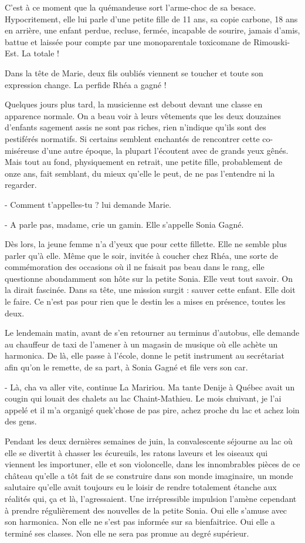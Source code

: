 C’est à ce moment que la quémandeuse sort l’arme-choc de sa besace. Hypocritement, elle lui parle d’une petite fille de 11 ans, sa copie carbone, 18 ans en arrière, une enfant perdue, recluse, fermée, incapable de sourire, jamais d’amis, battue et laissée pour compte par une monoparentale toxicomane de Rimouski-Est. La totale !

Dans la tête de Marie, deux fils oubliés viennent se toucher et toute son expression change. La perfide Rhéa a gagné !

Quelques jours plus tard, la musicienne est debout devant une classe en apparence normale. On a beau voir à leurs vêtements que les deux douzaines d’enfants sagement assis ne sont pas riches, rien n’indique qu’ils sont des pestiférés normatifs. Si certains semblent enchantés de rencontrer cette co-miséreuse d’une autre époque, la plupart l’écoutent avec de grands yeux gênés. Mais tout au fond, physiquement en retrait, une petite fille, probablement de onze ans, fait semblant, du mieux qu’elle le peut, de ne pas l’entendre ni la regarder.

- Comment t’appelles-tu ? lui demande Marie.

- A parle pas, madame, crie un gamin. Elle s’appelle Sonia Gagné.

Dès lors, la jeune femme n’a d’yeux que pour cette fillette. Elle ne semble plus parler qu’à elle. Même que le soir, invitée à coucher chez Rhéa, une sorte de commémoration des occasions où il ne faisait pas beau dans le rang, elle questionne abondamment son hôte sur la petite Sonia. Elle veut tout savoir. On la dirait fascinée. Dans sa tête, une mission surgit : sauver cette enfant. Elle doit le faire. Ce n’est pas pour rien que le destin les a mises en présence, toutes les deux.

Le lendemain matin, avant de s’en retourner au terminus d’autobus, elle demande au chauffeur de taxi de l’amener à un magasin de musique où elle achète un harmonica. De là, elle passe à l’école, donne le petit instrument au secrétariat afin qu’on le remette, de sa part, à Sonia Gagné et file vers son car.

- Là, cha va aller vite, continue La Maririou. Ma tante Denije à Québec avait un cougin qui louait des chalets au lac Chaint-Mathieu. Le mois chuivant, je l’ai appelé et il m’a organigé quek’chose de pas pire, achez proche du lac et achez loin des gens.

Pendant les deux dernières semaines de juin, la convalescente séjourne au lac où elle se divertit à chasser les écureuils, les ratons laveurs et les oiseaux qui viennent les importuner, elle et son violoncelle, dans les innombrables pièces de ce château qu’elle a tôt fait de se construire dans son monde imaginaire, un monde salutaire qu’elle avait toujours eu le loisir de rendre totalement étanche aux réalités qui, ça et là, l’agressaient. Une irrépressible impulsion l’amène cependant à prendre régulièrement des nouvelles de la petite Sonia. Oui elle s’amuse avec son harmonica. Non elle ne s’est pas informée sur sa bienfaitrice. Oui elle a terminé ses classes. Non elle ne sera pas promue au degré supérieur.

